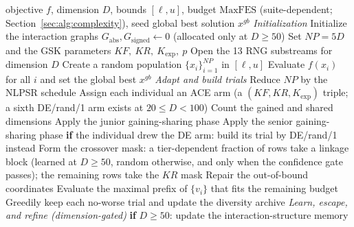 \begin{algorithm}[p]
\caption{\textbf{Pseudo-code of the DT-GSK algorithm.} The junior and senior
gaining-sharing \emph{vector-update equations} are retained unchanged; the
generation around them is not---crossover masking, tie handling, the population
size, and the senior partition are all modified. The added subsystems and their
fixed execution order are listed in Section~\ref{sec:algorithm}.}
\label{alg:dt-gsk}
\begin{algorithmic}[1]
\Require objective $f$, dimension $D$, bounds $[\ell,u]$, budget $\mathrm{MaxFES}$ (suite-dependent; Section~\ref{sec:alg:complexity}), seed
\Ensure global best solution $x^{gb}$
\Statex
\Statex \emph{Initialization}
\State Initialize the interaction graphs $G_{\mathrm{abs}}, G_{\mathrm{signed}} \gets 0$ (allocated only at $D\ge50$)
\State Set $NP{=}5D$ and the GSK parameters $KF,\ KR,\ K_{\exp},\ p$
\State Open the 13 RNG substreams for dimension $D$
\State Create a random population $\{x_i\}_{i=1}^{NP}$ in $[\ell,u]$
\State Evaluate $f(x_i)$ for all $i$ and set the global best $x^{gb}$
\Statex
{}
  \Statex
  \Statex \quad\emph{Adapt and build trials}
  \State Reduce $NP$ by the NLPSR schedule 
  \State Assign each individual an ACE arm (a $(KF, KR, K_{\exp})$ triple; a sixth DE/rand/1 arm exists at $20{\le}D{<}100$)
  \State Count the gained and shared dimensions 
  \State Apply the junior gaining-sharing phase
  \State Apply the senior gaining-sharing phase
  \State \textbf{if} the individual drew the DE arm: build its trial by DE/rand/1 instead 
  \State Form the crossover mask: a tier-dependent fraction of rows take a linkage block (learned at $D{\ge}50$, random otherwise, and only when the confidence gate passes); the remaining rows take the $KR$ mask 
  \State Repair the out-of-bound coordinates
  \State Evaluate the maximal prefix of $\{v_i\}$ that fits the remaining budget 
  \State Greedily keep each no-worse trial and update the diversity archive 
  \Statex
  \Statex \quad\emph{Learn, escape, and refine \textnormal{(dimension-gated)}}
  \State \textbf{if} $D{\ge}50$: update the interaction-structure memory 

\end{algorithmic}
\end{algorithm}
